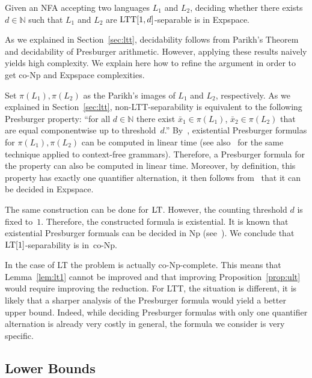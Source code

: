 \documentclass{LMCS}
\newcommand\nat{\ensuremath{\mathbb{N}}\xspace}
\newcommand{\lt}{\textup{LT}\xspace}
\newcommand{\ltt}{\textup{LTT}\xspace}
\theoremstyle{plain}
\begin{document}
\begin{lem} \label{lem:ltt1} Given an NFA accepting two languages $L_1$ and
  $L_2$, deciding whether there exists $d \in \nat$ such that $L_1$ and $L_2$
  are $\ltt[1,d]$-separable is in {\sc Expspace}.
\end{lem}

As we explained in Section~\ref{sec:ltt}, decidability follows from
Parikh's Theorem and decidability of Presburger arithmetic. However,
applying these results naively yields high complexity. We explain
here how to refine the argument in order to get {\sc co-Np} and {\sc
Expspace} complexities. 

Set $\pi(L_1), \pi(L_2)$ as the Parikh's images of $L_1$ and
$L_2$, respectively. As we explained in Section~\ref{sec:ltt}, non-\ltt-separability is
equivalent to the following Presburger property: ``for all $d \in \nat$ there
exist $\bar{x}_1 \in \pi(L_1)$, $\bar{x}_2 \in \pi(L_2)$ that are equal
componentwise up to threshold~$d$.'' By~\cite{SeidlSMH04}, existential
Presburger formulas for $\pi(L_1),\pi(L_2)$ can be computed in linear time
(see also~\cite{VSS05} for the same technique applied to context-free
grammars). Therefore, a Presburger formula for the property can also be
computed in linear time. Moreover, by definition, this property has exactly
one quantifier alternation, it then follows from~\cite{ReddyLoveland:1978} that it
can be decided in {\sc Expspace}.

The same construction can be done for $\lt$. However, the counting
threshold $d$ is fixed to~$1$. Therefore, the constructed formula is
existential. It is known that existential Presburger formuals can be
decided in {\sc Np} (see~\cite{BoroshTreybig:76,gathen78}). We conclude that 
$\lt[1]$-separability is in~{\sc co-Np}. 

In the case of \lt the problem is actually {\sc co-Np}-complete. This
means that Lemma~\ref{lem:lt1} cannot be improved and that improving
Proposition~\ref{prop:ult} would require improving the reduction.  For
\ltt, the situation is different, it is likely that a sharper analysis
of the Presburger formula would yield a better upper bound. Indeed,
while deciding Presburger formulas with only one quantifier
alternation is already very costly in general, the formula we consider
is very specific.






\subsection{Lower Bounds}
\end{document}
